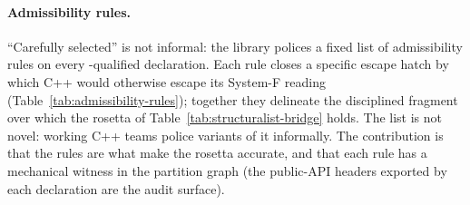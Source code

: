 \documentclass[11pt, a4paper]{article}
\begin{document}
\paragraph{Admissibility rules.}
``Carefully selected'' is not informal: the library polices a fixed list of admissibility rules on every -qualified declaration.
Each rule closes a specific escape hatch by which C++ would otherwise escape its System-F reading (Table~\ref{tab:admissibility-rules}); together they delineate the disciplined fragment over which the rosetta of Table~\ref{tab:structuralist-bridge} holds.
The list is not novel: working C++ teams police variants of it informally.
The contribution is that the rules are what make the rosetta accurate, and that each rule has a mechanical witness in the partition graph (the public-API headers exported by each  declaration are the audit surface).
\end{document}
